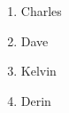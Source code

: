 \documentclass{article}
\begin{document}
	
	\begin{enumerate}
		\item Charles
		\item Dave
		\item Kelvin
		\item Derin
	\end{enumerate}
\end{document}
